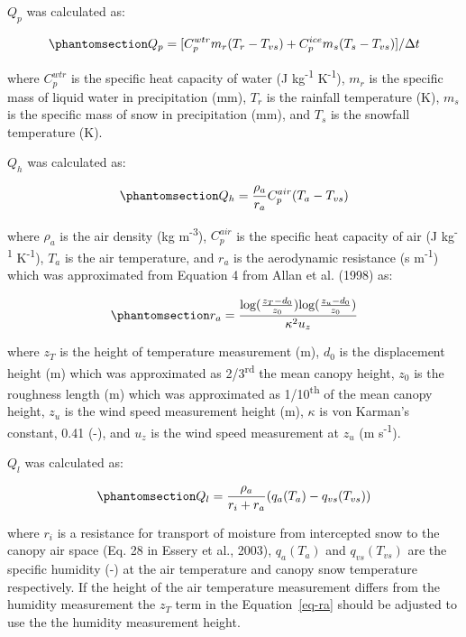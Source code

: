 \documentclass[
  letterpaper,
  DIV=11,
  numbers=noendperiod]{scrartcl}
\begin{document}
\(Q_p\) was calculated as:

\begin{equation}\phantomsection\label{eq-qp}{
Q_p = [C_p^{wtr} m_r(T_r - T_{vs}) + C_p^{ice} m_s(T_s - T_{vs})] / \Delta t
}\end{equation}

where \(C_p^{wtr}\) is the specific heat capacity of water (J
kg\textsuperscript{-1} K\textsuperscript{-1}), \(m_r\) is the specific
mass of liquid water in precipitation (mm), \(T_r\) is the rainfall
temperature (K), \(m_s\) is the specific mass of snow in precipitation
(mm), and \(T_s\) is the snowfall temperature (K).

\(Q_h\) was calculated as:

\begin{equation}\phantomsection\label{eq-qh}{
Q_h = \frac{\rho_a}{r_a} C_p^{air} (T_a - T_{vs})
}\end{equation}

where \(\rho_a\) is the air density (kg m\textsuperscript{-3}),
\(C_p^{air}\) is the specific heat capacity of air (J
kg\textsuperscript{-1} K\textsuperscript{-1}), \(T_a\) is the air
temperature, and \(r_a\) is the aerodynamic resistance (s
m\textsuperscript{-1}) which was approximated from Equation 4 from Allan
et al. (1998) as:

\begin{equation}\phantomsection\label{eq-ra}{
r_a = \frac{\text{log}(\frac{z_T - d_0}{z_0})\text{log}(\frac{z_u - d_0}{z_0})}{\kappa^2 u_z}
}\end{equation}

where \(z_T\) is the height of temperature measurement (m), \(d_0\) is
the displacement height (m) which was approximated as
2/3\textsuperscript{rd} the mean canopy height, \(z_0\) is the roughness
length (m) which was approximated as 1/10\textsuperscript{th} of the
mean canopy height, \(z_u\) is the wind speed measurement height (m),
\(\kappa\) is von Karman's constant, 0.41 (-), and \(u_z\) is the wind
speed measurement at \(z_u\) (m s\textsuperscript{-1}).

\(Q_l\) was calculated as:

\begin{equation}\phantomsection\label{eq-ql}{
Q_l = \frac{\rho_a}{r_i+r_a} (q_a(T_a) - q_{vs}(T_{vs}))
}\end{equation}

where \(r_i\) is a resistance for transport of moisture from intercepted
snow to the canopy air space (Eq. 28 in Essery et al., 2003),
\(q_a(T_a)\) and \(q_{vs}(T_{vs})\) are the specific humidity (-) at the
air temperature and canopy snow temperature respectively. If the height
of the air temperature measurement differs from the humidity measurement
the \(z_T\) term in the Equation~\ref{eq-ra} should be adjusted to use
the the humidity measurement height.
\end{document}

